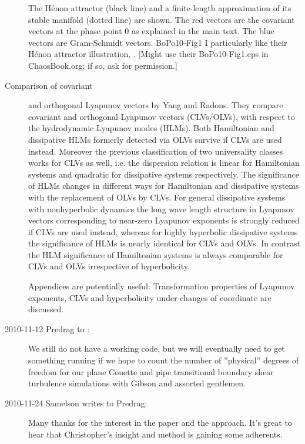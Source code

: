 \begin{description}
%
 {}{
The H\'enon attractor (black line) and a finite-length
approximation of its stable manifold (dotted line) are shown.
The red vectors are the covariant vectors at the phase point
0 as explained in the main text. The blue vectors are
Gram-Schmidt vectors.
}{BoPo10-Fig1}
%
I particularly like their H\'enon attractor illustration,
.
[Might use their BoPo10-Fig1.eps in ChaosBook.org; if so,
ask for permission.]

\item[Comparison of covariant] and orthogonal {Lyapunov
vectors} by Yang and Radons. They compare
covariant and orthogonal Lyapunov vectors (CLVs/OLVs), with
respect to the hydrodynamic Lyapunov modes (HLMs). Both
Hamiltonian and dissipative HLMs formerly detected via OLVs
survive if CLVs are used instead. Moreover the previous
classification of two universality classes works for CLVs as
well, i.e. the dispersion relation is linear for Hamiltonian
systems and quadratic for dissipative systems respectively.
The significance of HLMs changes in different ways for
Hamiltonian and dissipative systems with the replacement of
OLVs by CLVs. For general dissipative systems with
nonhyperbolic dynamics the long wave length structure in
Lyapunov vectors corresponding to near-zero Lyapunov
exponents is strongly reduced if CLVs are used instead,
whereas for highly hyperbolic dissipative systems the
significance of HLMs is nearly identical for CLVs and OLVs.
In contrast the HLM significance of Hamiltonian systems is
always comparable for CLVs and OLVs irrespective of
hyperbolicity.

Appendices are potentially useful: Transformation properties
of Lyapunov exponents, CLVs and hyperbolicity under changes
of coordinate are discussed.

\item[2010-11-12 Predrag to
\HREF{http://www.coas.oregonstate.edu/faculty/samelson.html}{Roger M. Samelson}:]
We still do not have a working code, but we will eventually need to get
something running if we hope to count the number of ''physical'' degrees of
freedom for our plane Couette and pipe transitional boundary shear
turbulence simulations with Gibson and assorted gentlemen.

\item[2010-11-24 Samelson writes to Predrag:]
Many thanks for the interest in the paper and the
approach.  It's great to hear that Christopher's insight and method is
gaining some adherents.


\end{description}
